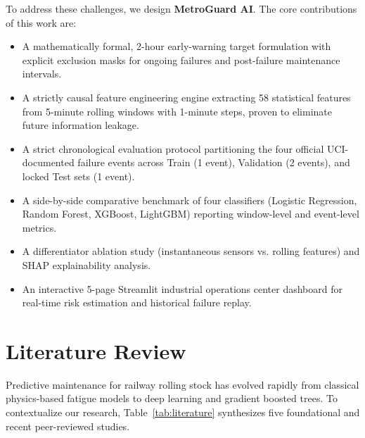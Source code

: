\documentclass[10pt,twocolumn,a4paper]{article}
\begin{document}
To address these challenges, we design \textbf{MetroGuard AI}. The core contributions of this work are:
\begin{itemize}
    \item A mathematically formal, 2-hour early-warning target formulation with explicit exclusion masks for ongoing failures and post-failure maintenance intervals.
    \item A strictly causal feature engineering engine extracting 58 statistical features from 5-minute rolling windows with 1-minute steps, proven to eliminate future information leakage.
    \item A strict chronological evaluation protocol partitioning the four official UCI-documented failure events across Train (1 event), Validation (2 events), and locked Test sets (1 event).
    \item A side-by-side comparative benchmark of four classifiers (Logistic Regression, Random Forest, XGBoost, LightGBM) reporting window-level and event-level metrics.
    \item A differentiator ablation study (instantaneous sensors vs. rolling features) and SHAP explainability analysis.
    \item An interactive 5-page Streamlit industrial operations center dashboard for real-time risk estimation and historical failure replay.
\end{itemize}

\section{Literature Review}
Predictive maintenance for railway rolling stock has evolved rapidly from classical physics-based fatigue models to deep learning and gradient boosted trees. To contextualize our research, Table~\ref{tab:literature} synthesizes five foundational and recent peer-reviewed studies.
\end{document}
